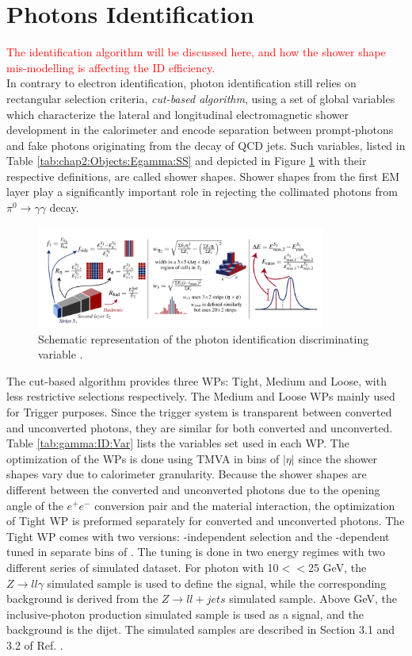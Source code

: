 \section{Photons Identification}
\label{gamma:ID}
\textcolor{red}{
The identification algorithm will be discussed here, and how the shower shape mis-modelling is affecting the ID efficiency. \\
}
In contrary to electron identification, photon identification still relies on rectangular selection criteria, \emph{cut-based algorithm}, using a set of global variables which characterize the lateral and longitudinal electromagnetic shower development in the calorimeter and encode separation between prompt-photons and fake photons originating from the decay of QCD jets. Such variables, listed in Table \ref{tab:chap2:Objects:Egamma:SS} and depicted in Figure \ref{fig:gamma:ID:SS} with their respective definitions, are called shower shapes. Shower shapes from the first EM layer play a significantly important role in rejecting the collimated photons from $\pi^0\rightarrow\gamma\gamma$ decay. \\ 
\begin{figure}[htbp]
    \centering
    \includegraphics[width=0.85\textwidth]{Ch3/Img/ShowerShapes.png}
    \caption{Schematic representation of the photon identification discriminating variable \cite{ShowerShapes_fig}. \\}
    \label{fig:gamma:ID:SS}
\end{figure}
The cut-based algorithm provides three WPs: Tight, Medium and Loose, with less restrictive selections respectively. The Medium and Loose WPs mainly used for Trigger purposes. Since the trigger system is transparent between converted and unconverted photons, they are similar for both converted and unconverted. Table \ref{tab:gamma:ID:Var} lists the variables set used in each WP. The optimization of the WPs is done using TMVA \cite{TMVA} in bins of $|\eta|$ since the shower shapes vary due to calorimeter granularity. Because the shower shapes are different between the converted and unconverted photons due to the opening angle of the $e^+e^-$ conversion pair and the material interaction, the optimization of Tight WP is preformed separately for converted and unconverted photons. The Tight WP comes with two versions: \eT-independent selection and the \eT-dependent tuned in separate bins of \eT. The tuning is done in two energy regimes with two different series of simulated dataset. For photon with 10$<$\eT$<$25 GeV, the $Z\rightarrow ll\gamma$ simulated sample is used to define the signal, while the corresponding background is derived from the $Z\rightarrow ll+jets$ simulated sample. Above  GeV, the inclusive-photon production simulated sample is used as a signal, and the background is the dijet. The simulated samples are described in Section 3.1 and 3.2 of Ref. \cite{Egamma_Perf_2017}.    
